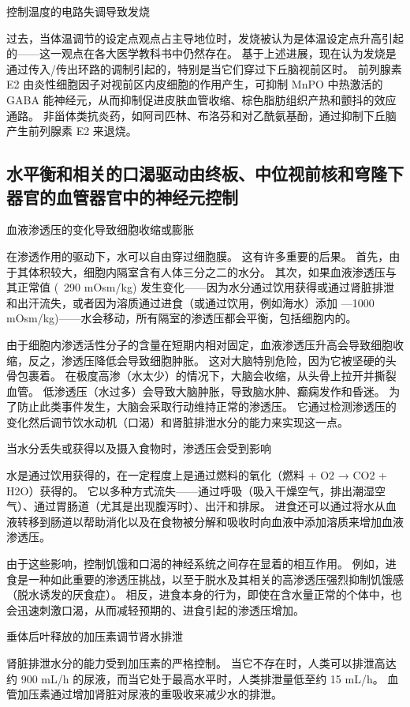 控制温度的电路失调导致发烧

过去，当体温调节的设定点观点占主导地位时，发烧被认为是体温设定点升高引起的——这一观点在各大医学教科书中仍然存在。 基于上述进展，现在认为发烧是通过传入/传出环路的调制引起的，特别是当它们穿过下丘脑视前区时。 前列腺素 E2 由炎性细胞因子对视前区内皮细胞的作用产生，可抑制 MnPO 中热激活的 GABA 能神经元，从而抑制促进皮肤血管收缩、棕色脂肪组织产热和颤抖的效应通路。 非甾体类抗炎药，如阿司匹林、布洛芬和对乙酰氨基酚，通过抑制下丘脑产生前列腺素 E2 来退烧。

\subsection{水平衡和相关的口渴驱动由终板、中位视前核和穹隆下器官的血管器官中的神经元控制}
血液渗透压的变化导致细胞收缩或膨胀

在渗透作用的驱动下，水可以自由穿过细胞膜。 这有许多重要的后果。 首先，由于其体积较大，细胞内隔室含有人体三分之二的水分。 其次，如果血液渗透压与其正常值 (~290 mOsm/kg) 发生变化——因为水分通过饮用获得或通过肾脏排泄和出汗流失，或者因为溶质通过进食（或通过饮用，例如海水）添加 —1000 mOsm/kg)——水会移动，所有隔室的渗透压都会平衡，包括细胞内的。

由于细胞内渗透活性分子的含量在短期内相对固定，血液渗透压升高会导致细胞收缩，反之，渗透压降低会导致细胞肿胀。 这对大脑特别危险，因为它被坚硬的头骨包裹着。 在极度高渗（水太少）的情况下，大脑会收缩，从头骨上拉开并撕裂血管。 低渗透压（水过多）会导致大脑肿胀，导致脑水肿、癫痫发作和昏迷。 为了防止此类事件发生，大脑会采取行动维持正常的渗透压。 它通过检测渗透压的变化然后调节饮水动机（口渴）和肾脏排泄水分的能力来实现这一点。

当水分丢失或获得以及摄入食物时，渗透压会受到影响

水是通过饮用获得的，在一定程度上是通过燃料的氧化（燃料 + O2 → CO2 + H2O）获得的。 它以多种方式流失——通过呼吸（吸入干燥空气，排出潮湿空气）、通过胃肠道（尤其是出现腹泻时）、出汗和排尿。 进食还可以通过将水从血液转移到肠道以帮助消化以及在食物被分解和吸收时向血液中添加溶质来增加血液渗透压。

由于这些影响，控制饥饿和口渴的神经系统之间存在显着的相互作用。 例如，进食是一种如此重要的渗透压挑战，以至于脱水及其相关的高渗透压强烈抑制饥饿感（脱水诱发的厌食症）。 相反，进食本身的行为，即使在含水量正常的个体中，也会迅速刺激口渴，从而减轻预期的、进食引起的渗透压增加。

垂体后叶释放的加压素调节肾水排泄

肾脏排泄水分的能力受到加压素的严格控制。 当它不存在时，人类可以排泄高达约 900 mL/h 的尿液，而当它处于最高水平时，人类排泄量低至约 15 mL/h。 血管加压素通过增加肾脏对尿液的重吸收来减少水的排泄。

